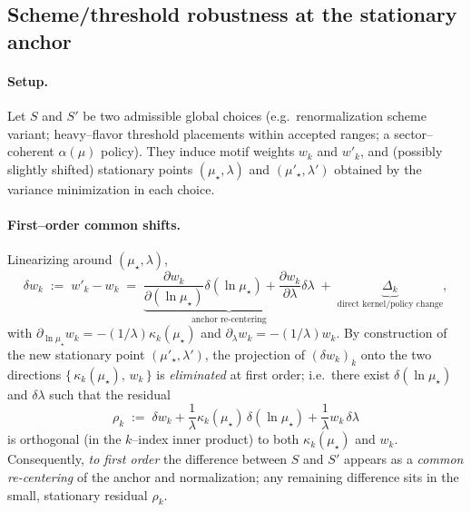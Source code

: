 \documentclass[aps,prd,onecolumn,amsmath,amssymb,superscriptaddress,nofootinbib,showpacs,showkeys]{revtex4-2}
\begin{document}
\subsection{ Scheme/threshold robustness at the stationary anchor}

\paragraph{Setup.}
Let $S$ and $S'$ be two admissible global choices (e.g.\ renormalization scheme variant; heavy--flavor threshold placements within accepted ranges; a sector--coherent $\alpha(\mu)$ policy). They induce motif weights $w_k$ and $w'_k$, and (possibly slightly shifted) stationary points $(\mu_\star,\lambda)$ and $(\mu'_\star,\lambda')$ obtained by the variance minimization in each choice.

\paragraph{First--order common shifts.}
Linearizing around $(\mu_\star,\lambda)$,
\begin{equation}
  \delta w_k\;:=\;w'_k-w_k
  \;=\;\underbrace{\frac{\partial w_k}{\partial(\ln\mu_\star)}\delta(\ln\mu_\star)
  +\frac{\partial w_k}{\partial\lambda}\delta\lambda}_{\text{anchor re-centering}}
  \;+\;\underbrace{\Delta_k}_{\text{direct kernel/policy change}},
  \label{eq:A-w-diff}
\end{equation}
with $\partial_{\ln\mu_\star}w_k=-(1/\lambda)\kappa_k(\mu_\star)$ and $\partial_\lambda w_k=-(1/\lambda)w_k$.
By construction of the new stationary point $(\mu'_\star,\lambda')$, the projection of $(\delta w_k)_k$ onto the two directions $\{\,\kappa_k(\mu_\star),\,w_k\,\}$ is \emph{eliminated} at first order; i.e.\ there exist $\delta(\ln\mu_\star)$ and $\delta\lambda$ such that the residual
\begin{equation}
  \rho_k\;:=\;\delta w_k+\frac{1}{\lambda}\kappa_k(\mu_\star)\,\delta(\ln\mu_\star)
                   +\frac{1}{\lambda}w_k\,\delta\lambda
  \label{eq:A-rho}
\end{equation}
is orthogonal (in the $k$--index inner product) to both $\kappa_k(\mu_\star)$ and $w_k$. Consequently, \emph{to first order} the difference between $S$ and $S'$ appears as a \emph{common re-centering} of the anchor and normalization; any remaining difference sits in the small, stationary residual $\rho_k$.
\end{document}
